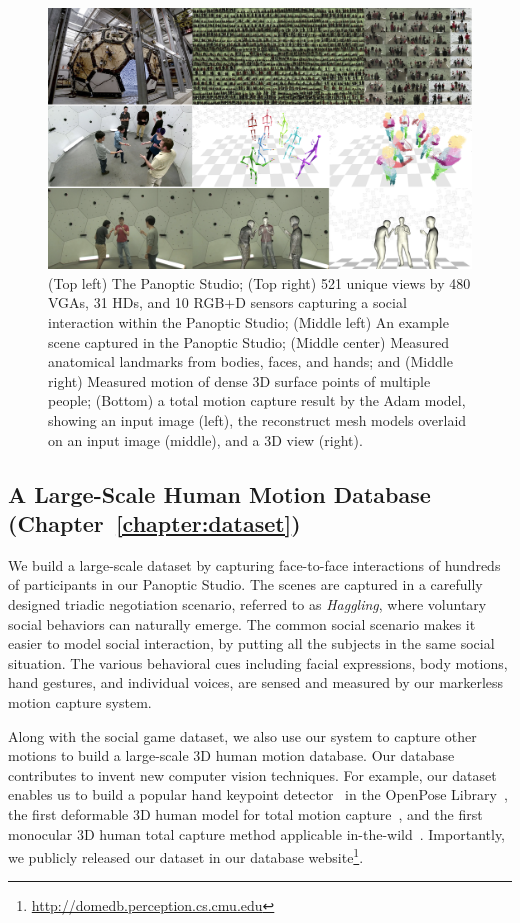 \begin{figure}[t]
	\centering
	\includegraphics[width=\textwidth]{figures/teaser_4}
	\caption{(Top left) The Panoptic Studio; (Top right) 521 unique views by 480 VGAs, 31 HDs, and 10 RGB+D sensors capturing a social interaction within the Panoptic Studio; (Middle left) An example scene captured in the Panoptic Studio; (Middle center) Measured anatomical landmarks from bodies, faces, and hands; and (Middle right) Measured motion of dense 3D surface points of multiple people; (Bottom) a total motion capture result by the Adam model, showing an input image (left), the reconstruct mesh models overlaid on an input image (middle), and a 3D view (right).}	
	\label{fig:teaser}
\end{figure}

\subsection{A Large-Scale Human Motion Database (Chapter~\ref{chapter:dataset})  }
We build a large-scale dataset by capturing face-to-face interactions of hundreds of participants in our Panoptic Studio. The scenes are captured in a carefully designed triadic negotiation scenario, referred to as \emph{Haggling}, where voluntary social behaviors can naturally emerge. The common social scenario makes it easier to model social interaction, by putting all the subjects in the same social situation. The various behavioral cues including facial expressions, body motions, hand gestures, and individual voices, are sensed and measured by our markerless motion capture system. 

Along with the social game dataset, we also use our system to capture other motions to build a large-scale 3D human motion database. Our database contributes to invent new computer vision techniques. For example, our dataset enables us to build a popular hand keypoint detector~\cite{simon2017hand} in the OpenPose Library~\cite{openpose}, the first deformable 3D human model for total motion capture~\cite{joo2018}, and the first monocular 3D human total capture method applicable in-the-wild~\cite{Xiang2019}. Importantly, we publicly released our dataset in our database website\footnote{\url{http://domedb.perception.cs.cmu.edu}}.


